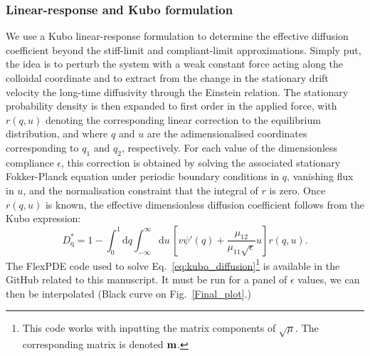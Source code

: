 \subsubsection{Linear-response and Kubo formulation}
We use a Kubo linear-response formulation to determine the effective diffusion coefficient beyond the stiff-limit and compliant-limit approximations. Simply put, the idea is to perturb the system with a weak constant force acting along the colloidal coordinate and to extract from the change in the stationary drift velocity the long-time diffusivity through the Einstein relation. The stationary probability density is then expanded to first order in the applied force, with $r(q,u)$ denoting the corresponding linear correction to the equilibrium distribution, and where $q$ and $u$ are the adimensionalised coordinates corresponding to $q_1$ and $q_2$, respectively. For each value of the dimensionless compliance $\epsilon$, this correction is obtained by solving the associated stationary Fokker-Planck equation under periodic boundary conditions in $q$, vanishing flux in $u$, and the normalisation constraint that the integral of $r$ is zero. Once $r(q,u)$ is known, the effective dimensionless diffusion coefficient follows from the Kubo expression:
\begin{equation}
    D_\mathrm{q}^*=1-\int_0^1\mathrm{d}q\int_{-\infty}^{\infty}\mathrm{d}u\,
    \left[v\psi'(q)+\frac{\mu_{12}}{\mu_{11}\sqrt{\epsilon}}u\right]r(q,u).
    \label{eq:kubo_diffusion}
\end{equation}
The FlexPDE code used to solve Eq.~\ref{eq:kubo_diffusion}\footnote{This code works with inputting the matrix components of $\sqrt{\mu}$. The corresponding matrix is denoted $\mathbf{m}$.} is available in the GitHub related to this manuscript. It must be run for a panel of $\epsilon$ values, we can then be interpolated (Black curve on Fig.~\ref{Final_plot}.)


